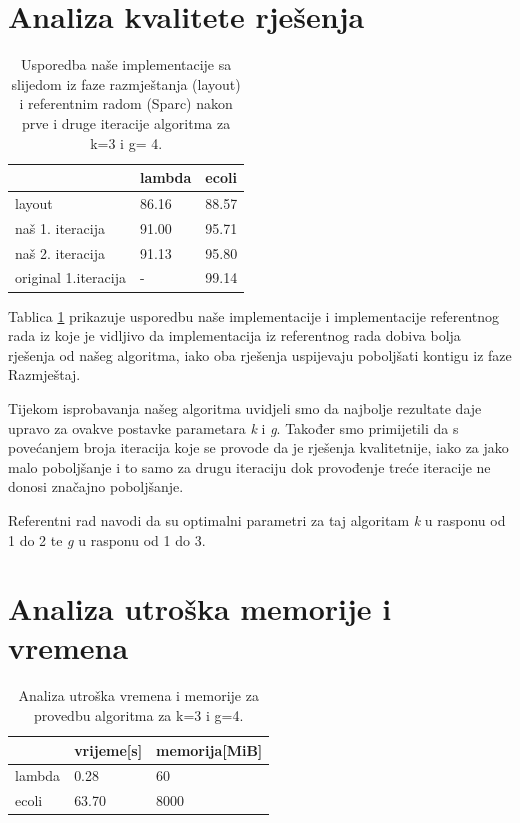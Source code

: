 \documentclass[times, utf8, seminar, numeric]{fer}
\begin{document}
\section{Analiza kvalitete rješenja}
\begin{table}[htb]
	\centering
	\begin{tabular}{l|ll}
		& \multicolumn{1}{l}{lambda} & ecoli \\ 	\hline
		layout 					& 86.16 	& 88.57 \\ 	\hline
		naš 1. iteracija  		& 91.00     & 95.71 \\	\hline
		naš 2. iteracija  		& 91.13     & 95.80 \\	\hline
		original 1.iteracija   	&    - 	  	& 99.14 \\ 
	\end{tabular}
	\caption{Usporedba naše implementacije sa slijedom iz faze razmještanja (layout) i referentnim radom (Sparc) nakon prve i druge iteracije algoritma za k=3 i g= 4.}
	\label{table:kvaliteta}
\end{table}

Tablica \ref{table:kvaliteta} prikazuje usporedbu naše implementacije i implementacije referentnog rada iz koje je vidljivo da implementacija iz referentnog rada dobiva bolja rješenja od našeg algoritma, iako oba rješenja uspijevaju poboljšati kontigu iz faze Razmještaj.

Tijekom isprobavanja našeg algoritma uvidjeli smo da najbolje rezultate daje upravo za ovakve postavke parametara \emph{k} i \emph{g}. Također smo primijetili da s povećanjem broja iteracija koje se provode da je rješenja kvalitetnije, iako za jako malo poboljšanje i to samo za drugu iteraciju dok provođenje treće iteracije ne donosi značajno poboljšanje.

Referentni rad navodi da su optimalni parametri za taj algoritam \emph{k} u rasponu od 1 do 2 te \emph{g} u rasponu od 1 do 3. 

\section{Analiza utroška memorije i vremena}
\begin{table}[htb]
	\centering
	\begin{tabular}{l|ll}
		& \multicolumn{1}{l}{vrijeme[s]} & memorija[MiB] \\ 	\hline
		lambda			& 0.28		& 60 	\\ 	\hline
		ecoli  			& 63.70     & 8000  \\	\hline
	\end{tabular}
	\caption{Analiza utroška vremena i memorije za provedbu algoritma za k=3 i g=4.}
	\label{table:memorija}
\end{table}
\end{document}
